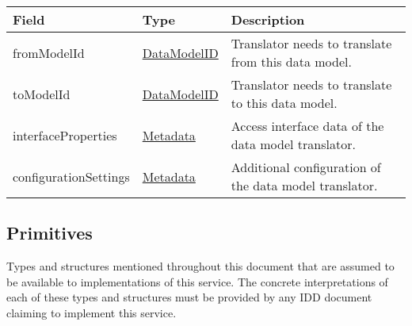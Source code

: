 \documentclass[a4paper]{arrowhead}
\newcommand{\pref}[1]{{\textcolor{ArrowheadGrey}{\hyperref[sec:model:primitives:#1]{#1}}}}
\begin{document}
\begin{table}[ht!]
\begin{tabularx}{\textwidth}{| p{4.5cm} | p{3.5cm} | X |} \hline
\rowcolor{gray!33} Field & Type      & Description \\ \hline
fromModelId & \pref{DataModelID} & Translator needs to translate from this data model.  \\ \hline
toModelId & \pref{DataModelID} & Translator needs to translate to this data model. \\ \hline
interfaceProperties &\hyperref[sec:model:Metadata]{Metadata} & Access interface data of the data model translator. \\ \hline
configurationSettings &\hyperref[sec:model:Metadata]{Metadata} & Additional configuration of the data model translator. \\ \hline
\end{tabularx}
\end{table}

\subsection{Primitives}
\label{sec:model:primitives}

Types and structures mentioned throughout this document that are assumed to be available to implementations of this service.
The concrete interpretations of each of these types and structures must be provided by any IDD document claiming to implement this service.
\end{document}
